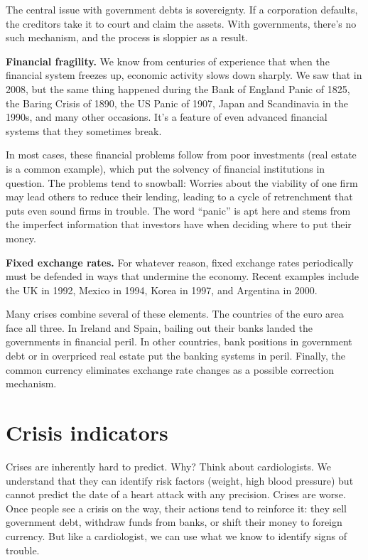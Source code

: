 The central issue with government debts is sovereignty.
If a corporation defaults, the creditors take it to court
and claim the assets.
With governments, there's no such mechanism, and the process
is sloppier as a result.

\textbf{Financial fragility.}
We know from centuries of experience that when the
financial system freezes up,
economic activity slows down sharply.
We saw that in 2008,
but the same thing happened during the Bank of England Panic of 1825,
the Baring Crisis of 1890,
the US Panic of 1907,
Japan and Scandinavia in the 1990s,
and many other occasions.
It's a feature of even advanced financial systems that they
sometimes break.

In most cases, these financial problems follow from
poor investments (real estate is a common example),
which put the solvency of financial institutions in question.
The problems tend to snowball: Worries about the viability of one firm may lead others to
reduce their lending, leading to a cycle of retrenchment
that puts even sound firms in trouble.
The word ``panic'' is apt here and stems
from the imperfect information that investors have
when deciding where to put their money.


\textbf{Fixed exchange rates.} For whatever reason, fixed exchange rates periodically
must be defended in ways that undermine the economy.
Recent examples include the UK in 1992,
Mexico in 1994,
Korea in 1997,
and Argentina in 2000.

Many crises combine several of these elements.
The countries of the euro area face all three.
In Ireland and Spain, bailing out their banks
landed the governments in financial peril.
In other countries, bank positions in government debt
or in overpriced real estate put the banking systems in peril.
Finally, the common currency eliminates exchange rate changes
as a possible correction mechanism.


\section{Crisis indicators}

Crises are inherently hard to predict.
Why?
Think about cardiologists.
We understand that they can identify risk factors
(weight, high blood pressure) but cannot predict
the date of a heart attack with any precision.
Crises are worse.
Once people see a crisis on the way,
their actions tend to reinforce it:
they sell government debt,
withdraw funds from banks,
or shift their money to foreign currency.
But like a cardiologist, we can use what we know
to identify signs of trouble.


